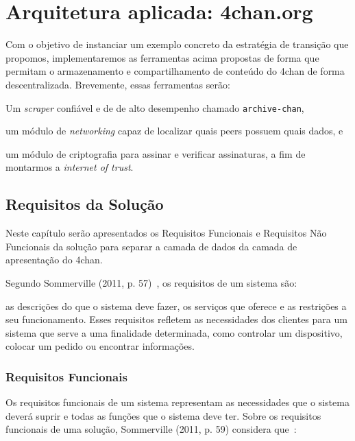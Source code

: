
\chapter{Arquitetura aplicada: 4chan.org}

Com o objetivo de instanciar um exemplo concreto da estratégia de transição que propomos, implementaremos as ferramentas acima propostas de forma que permitam o armazenamento e compartilhamento de conteúdo do 4chan de forma descentralizada.
Brevemente, essas ferramentas serão:
\begin{enumerate*}[label=(\arabic*)]
    \item Um \textit{scraper} confiável e de de alto desempenho chamado \texttt{archive-chan},
    \item um módulo de \textit{networking} capaz de localizar quais peers possuem quais dados, e
    \item um módulo de criptografia para assinar e verificar assinaturas, a fim de montarmos a \textit{internet of trust}. 
\end{enumerate*}

\section{Requisitos da Solução}

Neste capítulo serão apresentados os Requisitos Funcionais e Requisitos Não Funcionais da solução para separar a camada de dados da camada de apresentação do 4chan.

Segundo Sommerville (2011, p. 57)~\cite{SOMMERVILLE1}, os requisitos de um sistema são:

\begin{directcite}
as descrições do que o sistema deve fazer, os serviços que
oferece e as restrições a seu funcionamento.
Esses requisitos refletem as necessidades dos clientes para
um sistema que serve a uma finalidade determinada, como controlar
um dispositivo, colocar um pedido ou encontrar informações.
\end{directcite}

\subsection{Requisitos Funcionais}

Os requisitos funcionais de um sistema representam as necessidades que o sistema deverá suprir e todas as funções que o sistema deve ter.
Sobre os requisitos funcionais de uma solução, Sommerville (2011, p. 59) considera que~\cite{SOMMERVILLE1}:

